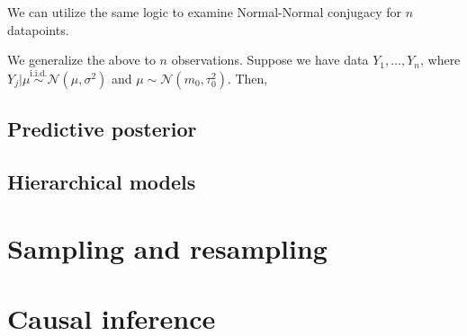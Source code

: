 \documentclass[12pt]{article}
\newcommand{\N}{\mathcal{N}}
\begin{document}
\medskip
We can utilize the same logic to examine Normal-Normal conjugacy for $n$ datapoints.

\medskip

\medskip
\begin{tcolorbox}[breakable, title = \textbf{Theorem 9.5.5 in textbook}: Normal-normal conjugacy ($n$ observations)]
    We generalize the above to $n$ observations. Suppose we have data $Y_1,\dots,Y_n$, where $Y_j|\mu \overset{\text{i.i.d.}}{\sim} \N(\mu,\sigma^2)$ and $\mu \sim \N(m_0,\tau_0^2)$. Then, 
\end{tcolorbox}
\subsection{Predictive posterior}

\subsection{Hierarchical models}
\noindent 

\section{Sampling and resampling}

\section{Causal inference}
\end{document}
